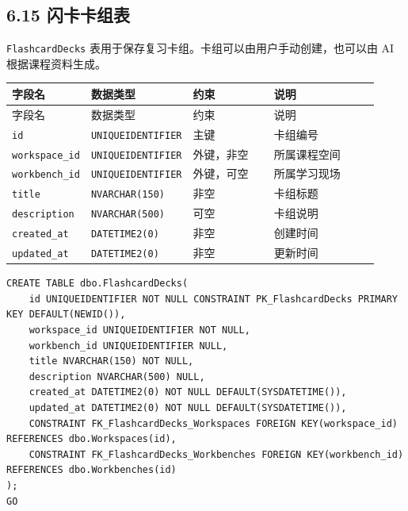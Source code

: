 \documentclass[10pt,a4paper,fontset=none]{ctexart}
\begin{document}
\subsection*{6.15 闪卡卡组表}

\texttt{FlashcardDecks} 表用于保存复习卡组。卡组可以由用户手动创建，也可以由 AI 根据课程资料生成。\par

\begingroup\scriptsize
\renewcommand{\arraystretch}{1.18}
\setlength{\LTleft}{0pt}
\setlength{\LTright}{0pt}
\begin{longtable}{>{\raggedright\arraybackslash}p{0.20\linewidth}>{\raggedright\arraybackslash}p{0.16\linewidth}>{\raggedright\arraybackslash}p{0.24\linewidth}>{\raggedright\arraybackslash}p{0.32\linewidth}}
\toprule
字段名 & 数据类型 & 约束 & 说明 \\
\midrule
\endfirsthead
\toprule
字段名 & 数据类型 & 约束 & 说明 \\
\midrule
\endhead
\texttt{id} & \texttt{UNIQUEIDENTIFIER} & 主键 & 卡组编号 \\
\texttt{workspace\_id} & \texttt{UNIQUEIDENTIFIER} & 外键，非空 & 所属课程空间 \\
\texttt{workbench\_id} & \texttt{UNIQUEIDENTIFIER} & 外键，可空 & 所属学习现场 \\
\texttt{title} & \texttt{NVARCHAR(150)} & 非空 & 卡组标题 \\
\texttt{description} & \texttt{NVARCHAR(500)} & 可空 & 卡组说明 \\
\texttt{created\_at} & \texttt{DATETIME2(0)} & 非空 & 创建时间 \\
\texttt{updated\_at} & \texttt{DATETIME2(0)} & 非空 & 更新时间 \\
\bottomrule
\end{longtable}
\endgroup


\begin{Verbatim}[fontsize=\scriptsize,frame=single]
CREATE TABLE dbo.FlashcardDecks(
    id UNIQUEIDENTIFIER NOT NULL CONSTRAINT PK_FlashcardDecks PRIMARY KEY DEFAULT(NEWID()),
    workspace_id UNIQUEIDENTIFIER NOT NULL,
    workbench_id UNIQUEIDENTIFIER NULL,
    title NVARCHAR(150) NOT NULL,
    description NVARCHAR(500) NULL,
    created_at DATETIME2(0) NOT NULL DEFAULT(SYSDATETIME()),
    updated_at DATETIME2(0) NOT NULL DEFAULT(SYSDATETIME()),
    CONSTRAINT FK_FlashcardDecks_Workspaces FOREIGN KEY(workspace_id) REFERENCES dbo.Workspaces(id),
    CONSTRAINT FK_FlashcardDecks_Workbenches FOREIGN KEY(workbench_id) REFERENCES dbo.Workbenches(id)
);
GO
\end{Verbatim}
\end{document}
